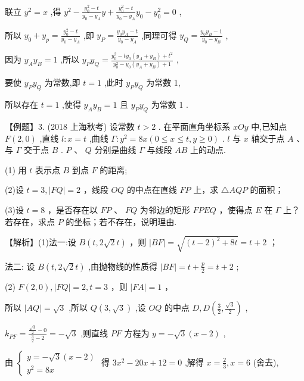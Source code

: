 \documentclass[10pt]{article}
\begin{document}
联立 \({y}^{2} = x\) ,得 \({y}^{2} - \frac{{y}_{0}^{2} - t}{{y}_{0} - {y}_{A}}y + \frac{{y}_{0}^{2} - t}{{y}_{0} - {y}_{A}}{y}_{0} - {y}_{0}^{2} = 0\) ,

所以 \({y}_{0} + {y}_{p} = \frac{{y}_{0}^{2} - t}{{y}_{0} - {y}_{A}}\) ,即 \({y}_{P} = \frac{{y}_{0}{y}_{A} - t}{{y}_{0} - {y}_{A}}\) ,同理可得 \({y}_{Q} = \frac{{y}_{0}{y}_{B} - 1}{{y}_{0} - {y}_{B}}\) ,

因为 \({y}_{A}{y}_{B} = 1\) ,所以 \({y}_{P}{y}_{Q} = \frac{{y}_{0}^{2} - t{y}_{0}\left( {{y}_{A} + {y}_{B}}\right)  + {t}^{2}}{{y}_{0}^{2} - {y}_{0}\left( {{y}_{A} + {y}_{B}}\right)  + 1}\) ,

要使 \({y}_{P}{y}_{Q}\) 为常数,即 \(t = 1\) ,此时 \({y}_{P}{y}_{Q}\) 为常数 1,

所以存在 \(t = 1\) ,使得 \({y}_{A}{y}_{B} = 1\) 且 \({y}_{P}{y}_{Q}\) 为常数 1 .

【例题】3. (2018 上海秋考) 设常数 \(t > 2\) . 在平面直角坐标系 \({xOy}\) 中,已知点 \(F\left( {2,0}\right)\) ,直线 \(l : x = t\) ,曲线 \(\Gamma  : {y}^{2} = {8x}\left( {0 \leq  x \leq  t,y \geq  0}\right)\) . \(l\) 与 \(x\) 轴交于点 \(A\) 、与 \(\Gamma\) 交于点 \(B\) . \(P\) 、 \(Q\) 分别是曲线 \(\Gamma\) 与线段 \({AB}\) 上的动点.

(1) 用 \(t\) 表示点 \(B\) 到点 \(F\) 的距离;

(2)设 \(t = 3,\left| {FQ}\right|  = 2\) ，线段 \({OQ}\) 的中点在直线 \({FP}\) 上，求 \(\bigtriangleup  {AQP}\) 的面积；

(3)设 \(t = 8\) ，是否存在以 \({FP}\) 、 \({FQ}\) 为邻边的矩形 \({FPEQ}\) ，使得点 \(E\) 在 \(\Gamma\) 上？若存在，求点 \(P\) 的坐标；若不存在，说明理由.

【解析】(1)法一:设 \(B\left( {t,2\sqrt{2}t}\right)\) ，则 \(\left| {BF}\right|  = \sqrt{{\left( t - 2\right) }^{2} + {8t}} = t + 2\) ；

法二: 设 \(B\left( {t,2\sqrt{2}t}\right)\) ,由抛物线的性质得 \(\left| {BF}\right|  = t + \frac{p}{2} = t + 2\) ;

(2) \(F\left( {2,0}\right) ,\left| {FQ}\right|  = 2,t = 3\) ，则 \(\left| {FA}\right|  = 1\) ，

所以 \(\left| {AQ}\right|  = \sqrt{3}\) ,所以 \(Q\left( {3,\sqrt{3}}\right)\) ,设 \({OQ}\) 的中点 \(D,D\left( {\frac{3}{2},\frac{\sqrt{3}}{2}}\right)\) ,

\({k}_{PF} = \frac{\frac{\sqrt{3}}{2} - 0}{\frac{3}{2} - 2} =  - \sqrt{3}\) ,则直线 \({PF}\) 方程为 \(y =  - \sqrt{3}\left( {x - 2}\right)\) ,

由 \(\left\{  \begin{array}{l} y =  - \sqrt{3}\left( {x - 2}\right) \\  {y}^{2} = {8x} \end{array}\right.\) 得 \(3{x}^{2} - {20x} + {12} = 0\) ,解得 \(x = \frac{2}{3},x = 6\) (舍去),
\end{document}
